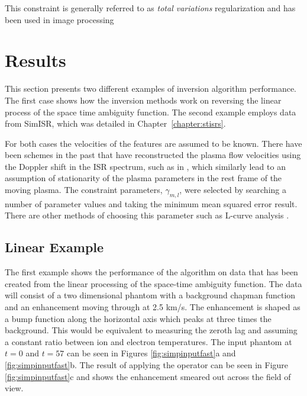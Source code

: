 \noindent This constraint is generally referred to as \textit{total variations} regularization and has been used in image processing \citep{Rudin:1992kn}

\section{Results}
\label{sec:results}
This section presents two different examples of inversion algorithm performance. The first case shows how  the inversion methods work on reversing the linear process of the space time ambiguity function. The second example employs data from SimISR, which was detailed in Chapter~\ref{chapter:stisrs}.

For both cases the velocities of the features are assumed to be known. There have been schemes in the past that have reconstructed the plasma flow velocities using the Doppler shift in the ISR spectrum, such as in \citet{butler:imagingfregiondrifts}, which similarly lead to an assumption of stationarity of the plasma parameters in the rest frame of the moving plasma. The constraint parameters, $\gamma_{m,l}$, were selected by searching a number of parameter values and taking the minimum mean squared error result. There are other methods of choosing this parameter such as L-curve analysis \citep{Karl:2005jy}. 

\subsection{Linear Example}

The first example shows the performance of the algorithm on data that has been created from the linear processing of the space-time ambiguity function. The data will consist of a two dimensional phantom with a background chapman function and an enhancement moving through at 2.5 km/s. The enhancement is shaped as a bump function along the horizontal axis which peaks at three times the background. This would be equivalent to measuring the zeroth lag and assuming a constant ratio between ion and electron temperatures. The input phantom at $t=0$ and $t=57$ can be seen in Figures \ref{fig:simpinputfast}a and \ref{fig:simpinputfast}b. The result of applying the operator can be seen in Figure \ref{fig:simpinputfast}c and shows the enhancement smeared out across the field of view.

